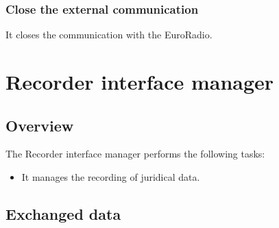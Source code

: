 \documentclass[nocc]{template/openetcs_report}
\begin{document}
\subsection{Close the external communication}
It closes the communication with the EuroRadio.

\chapter{Recorder interface manager}
\section{Overview}
The Recorder interface manager performs the following tasks:
\begin{itemize}
\item	It manages the recording of juridical data.
\end{itemize}

\section{Exchanged data}
\end{document}
